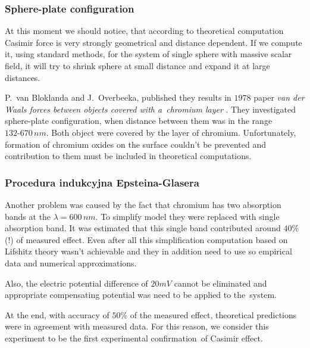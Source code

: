 \documentclass[10pt,t]{beamer}
\begin{document}
\begin{frame}
  \frametitle{Sphere-plate configuration}


  At this moment we should notice, that according to theoretical
  computation Casimir force is very strongly geometrical and distance
  dependent. If we compute it, using standard methods, for the system of
  single sphere with massive scalar field, it will try to shrink sphere at
  small distance and expand it at large distances.

  P.~van Bloklanda and J.~Overbeeka, published they results in $1978$ paper
  \textit{van der Waals forces between objects covered with a~chromium
    layer}
  \parencite{Blokland-Overbeek-van-der-Waals-forces-between-ETC-1978}.
  They investigated sphere-plate configuration, when distance between them
  was in the range $132\text{-}670 \, \si{nm}$. Both object were covered by
  the layer of chromium. Unfortunately, formation of chromium oxides on the
  surface couldn't be prevented and contribution to them must be included
  in theoretical computations.

\end{frame}





\begin{frame}
  \frametitle{Procedura indukcyjna Epsteina-Glasera}


  Another problem was caused by the fact that chromium has two absorption
  bands at the $\lambda = 600 \, \si{nm}$. To simplify model they were replaced
  with single absorption band. It was estimated that this single band
  contributed around $40\%$ (!) of measured effect. Even after all this
  simplification computation based on Lifshitz theory wasn't achievable and
  they in addition need to use so empirical data and numerical
  approximations.

  Also, the electric potential difference of $20 \si{mV}$ cannot be
  eliminated and appropriate compensating potential was need to be applied
  to the~system.

  At the end, with accuracy of $50\%$ of the measured effect, theoretical
  predictions were in agreement with measured data. For this reason, we
  consider this experiment to be the first experimental confirmation~of
  Casimir effect.

\end{frame}
\end{document}
